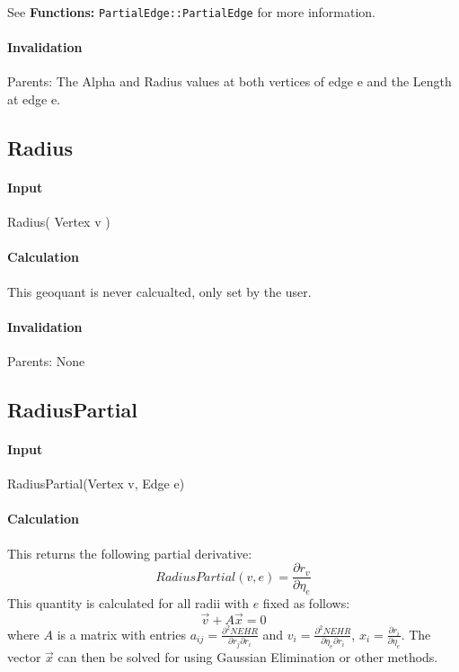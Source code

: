 See \textbf{Functions: }\texttt{PartialEdge::PartialEdge} for more
information.

\paragraph{Invalidation}

\bigskip Parents: The Alpha and Radius values at both vertices of edge e and
the Length at edge e.

\subsection{Radius}

\paragraph{Input}

Radius( Vertex v )

\paragraph{Calculation}

This geoquant is never calcualted, only set by the user.

\paragraph{Invalidation}

Parents: None

\bigskip 

\subsection{RadiusPartial}

\paragraph{Input}

RadiusPartial(Vertex v, Edge e)

\paragraph{Calculation}

This returns the following partial derivative: 
\begin{equation*}
RadiusPartial(v,e)=\frac{\partial r_{v}}{\partial \eta _{e}}
\end{equation*}%
This quantity is calculated for all radii with $e$ fixed as follows: 
\begin{equation*}
\overrightarrow{v}+A\overrightarrow{x}=0
\end{equation*}%
where $A$ is a matrix with entries $a_{ij}=\frac{\partial ^{2}NEHR}{\partial
r_{j}\partial r_{i}}$ and $v_{i}=\frac{\partial ^{2}NEHR}{\partial \eta
_{e}\partial r_{i}}$, $x_{i}=\frac{\partial r_{i}}{\partial \eta _{e}}$. The
vector $\overrightarrow{x}$ can then be solved for using Gaussian
Elimination or other methods.


